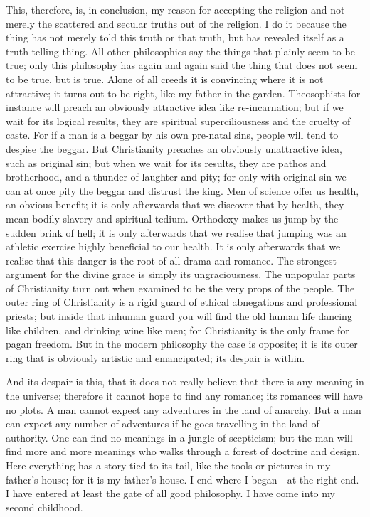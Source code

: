 This, therefore, is, in conclusion, my reason for accepting the religion and not merely the scattered and secular truths out of the religion. I do it because the thing has not merely told this truth or that truth, but has revealed itself as a truth-telling thing. All other philosophies say the things that plainly seem to be true; only this philosophy has again and again said the thing that does not seem to be true, but is true. Alone of all creeds it is convincing where it is not attractive; it turns out to be right, like my father in the garden. Theosophists for instance will preach an obviously attractive idea like re-incarnation; but if we wait for its logical results, they are spiritual superciliousness and the cruelty of caste. For if a man is a beggar by his own pre-natal sins, people will tend to despise the beggar. But Christianity preaches an obviously unattractive idea, such as original sin; but when we wait for its results, they are pathos and brotherhood, and a thunder of laughter and pity; for only with original sin we can at once pity the beggar and distrust the king. Men of science offer us health, an obvious benefit; it is only afterwards that we discover that by health, they mean bodily slavery and spiritual tedium. Orthodoxy makes us jump by the sudden brink of hell; it is only afterwards that we realise that jumping was an athletic exercise highly beneficial to our health. It is only afterwards that we realise that this danger is the root of all drama and romance. The strongest argument for the divine grace is simply its ungraciousness. The unpopular parts of Christianity turn out when examined to be the very props of the people. The outer ring of Christianity is a rigid guard of ethical abnegations and professional priests; but inside that inhuman guard you will find the old human life dancing like children, and drinking wine like men; for Christianity is the only frame for pagan freedom. But in the modern philosophy the case is opposite; it is its outer ring that is obviously artistic and emancipated; its despair is within.

And its despair is this, that it does not really believe that there is any meaning in the universe; therefore it cannot hope to find any romance; its romances will have no plots. A man cannot expect any adventures in the land of anarchy. But a man can expect any number of adventures if he goes travelling in the land of authority. One can find no meanings in a jungle of scepticism; but the man will find more and more meanings who walks through a forest of doctrine and design. Here everything has a story tied to its tail, like the tools or pictures in my father’s house; for it is my father’s house. I end where I began—at the right end. I have entered at least the gate of all good philosophy. I have come into my second childhood.

